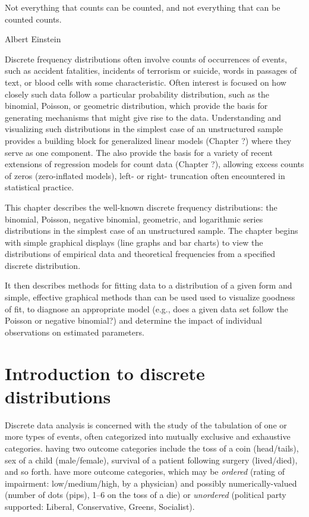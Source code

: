 \documentclass[11pt]{book}
\begin{document}
\epigraph{Not everything that counts can be counted, and not everything that
can be counted counts.}
{Albert Einstein}

Discrete frequency distributions often involve counts of occurrences of events,
such as accident fatalities, incidents of terrorism or suicide,
words in passages of text, or blood cells with some characteristic.
Often interest is focused on how closely such data follow a particular probability distribution,
such as the binomial, Poisson, or geometric distribution, which
provide the basis for generating mechanisms that might give rise to the
data.
Understanding and visualizing
such distributions
in the simplest case of an unstructured sample provides a building block for generalized
linear models (Chapter ?) where they serve as one component.  The also provide the basis for
a variety of recent extensions of regression models for count data (Chapter ?),
allowing excess counts of zeros (zero-inflated models), left- or right-
truncation often encountered in statistical practice.

This chapter describes the well-known discrete
frequency distributions: the binomial, Poisson, negative binomial,
geometric, and logarithmic series distributions in the simplest case of an unstructured sample.
The chapter begins with simple graphical displays (line graphs and bar charts) to view
the distributions of empirical data and theoretical frequencies from a specified
discrete distribution.

It then describes methods for fitting data to a distribution of a given form
and simple, effective
graphical methods than can be used used to visualize goodness of fit,
to diagnose an appropriate model (e.g., does a given data set follow the
Poisson or negative binomial?) and determine the impact of
individual observations on estimated parameters.

\section{Introduction to discrete distributions}\label{sec:discrete-intro}
Discrete data analysis is concerned with the study of the tabulation of one or
more types of events, often categorized into mutually exclusive and exhaustive
categories.   having two outcome categories include
the toss of a coin (head/tails), sex of a child (male/female), survival of
a patient following surgery (lived/died), and so forth.  
have more outcome categories, which may be \emph{ordered}
(rating of impairment: low/medium/high, by a physician)
and possibly numerically-valued 
(number of dots (pips), 1--6 on the toss of a die) 
or \emph{unordered} (political party supported: Liberal, Conservative, Greens, Socialist).
\end{document}
